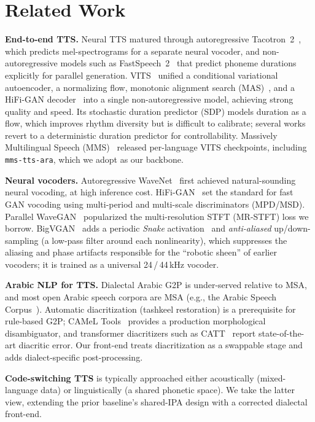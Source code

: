 \documentclass[10pt,twocolumn]{article}
\begin{document}
\section{Related Work}
\textbf{End-to-end TTS.} Neural TTS matured through autoregressive Tacotron~2~\cite{tacotron2},
which predicts mel-spectrograms for a separate neural vocoder, and non-autoregressive models
such as FastSpeech~2~\cite{fastspeech2} that predict phoneme durations explicitly for parallel
generation. VITS~\cite{vits} unified a conditional variational autoencoder, a
normalizing flow, monotonic alignment search (MAS)~\cite{glowtts}, and a HiFi-GAN
decoder~\cite{hifigan} into a single non-autoregressive model, achieving strong quality and
speed. Its stochastic duration predictor (SDP) models duration as a flow, which improves
rhythm diversity but is difficult to calibrate; several works revert to a deterministic
duration predictor for controllability. Massively Multilingual Speech (MMS)~\cite{mms}
released per-language VITS checkpoints, including \texttt{mms-tts-ara}, which we adopt as
our backbone.

\textbf{Neural vocoders.} Autoregressive WaveNet~\cite{wavenet} first achieved
natural-sounding neural vocoding, at high inference cost. HiFi-GAN~\cite{hifigan} set the
standard for fast GAN vocoding using multi-period and multi-scale discriminators (MPD/MSD). Parallel
WaveGAN~\cite{pwg} popularized the multi-resolution STFT (MR-STFT) loss we borrow.
BigVGAN~\cite{bigvgan} adds a periodic \emph{Snake} activation~\cite{snake} and
\emph{anti-aliased} up/down-sampling (a low-pass filter around each nonlinearity), which
suppresses the aliasing and phase artifacts responsible for the ``robotic sheen'' of
earlier vocoders; it is trained as a universal 24\,/\,44\,kHz vocoder.

\textbf{Arabic NLP for TTS.} Dialectal Arabic G2P is under-served relative to MSA, and most
open Arabic speech corpora are MSA (e.g., the Arabic Speech Corpus~\cite{halabi}). Automatic
diacritization (tashkeel restoration) is a prerequisite for rule-based G2P; CAMeL
Tools~\cite{cameltools} provides a production morphological disambiguator, and
transformer diacritizers such as CATT~\cite{catt} report state-of-the-art diacritic error.
Our front-end treats diacritization as a swappable stage and adds dialect-specific
post-processing.

\textbf{Code-switching TTS} is typically approached either acoustically (mixed-language
data) or linguistically (a shared phonetic space). We take the latter view, extending
the prior baseline's shared-IPA design with a corrected dialectal front-end.
\end{document}
